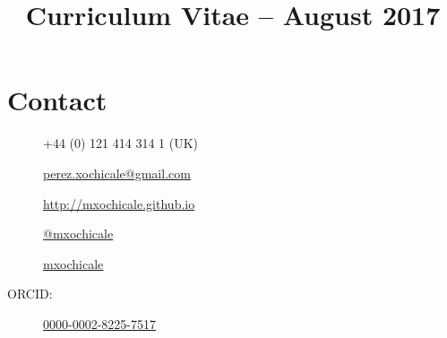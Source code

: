 \documentclass[10pt,a4paper,roman]{moderncv}
\title{Curriculum Vitae -- August 2017}
\begin{document}
%
%
\makecvtitle



%



\section{Contact}
%

\begin{changemargin}{2.4cm}{0.5cm}
  \begin{minipage}{.4\textwidth}
    \begin{description}
     \item [\faPhone ]    +44 (0) 121 414 314 1 (UK)
     \item[\faEnvelope]  \href{mailto:perez.xochicale@gmail.com}{perez.xochicale@gmail.com}
     \item[\faHome]  \href{http://mxochicale.github.io}{http://mxochicale.github.io}
     \end{description}
  \end{minipage}
  \begin{minipage}{.4\textwidth}
  \begin{description}
   \item[\faTwitter ] \href{https://twitter.com/_mxochicale}{@\textunderscore mxochicale}
   \item[\faGithub]  \href{https://github.com/mxochicale}{mxochicale}
   \item[ORCID:] \href{http://orcid.org/0000-0002-8225-7517}{0000-0002-8225-7517}
   \end{description}
  \end{minipage}
\end{changemargin}
\end{document}
